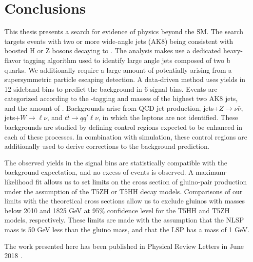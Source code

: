 \chapter{Conclusions}
\label{chap:conclusions}

This thesis presents a search for evidence of physics beyond the SM. The search targets events with two or more wide-angle jets (AK8) being consistent with boosted H or Z bosons decaying to \bbbar. The analysis makes use a dedicated heavy-flavor tagging algorithm used to identify large angle jets composed of two b quarks. We additionally require a large amount of \ptmiss potentially arising from a supersymmetric particle escaping detection. A data-driven method uses yields in 12 sideband bins to predict the background in 6 signal bins. Events are categorized according to the \bbbar-tagging and masses of the highest two \pt AK8 jets, and the amount of \ptmiss. Backgrounds arise from QCD jet production, jets+$Z\rightarrow\nu\bar{\nu}$, jets+$W\rightarrow\ell\nu$, and $t\bar{t}\rightarrow q q' \ell \nu$, in which the leptons are not identified. These backgrounds are studied by defining control regions expected to be enhanced in each of these processes. In combination with simulation, these control regions are additionally used to derive corrections to the background prediction. 

The observed yields in the signal bins are statistically compatible with the background expectation, and no excess of events is observed. A maximum-likelihood fit allows us to set limits on the cross section of gluino-pair production under the assumption of the T5ZH or T5HH decay models. Comparisons of our limits with the theoretical cross sections allow us to exclude gluinos with masses below 2010 and 1825 GeV at 95\% confidence level for the T5HH and T5ZH models, respectively. These limits are made with the assumption that the NLSP mass is 50 GeV less than the gluino mass, and that the LSP has a mass of 1 GeV.

The work presented here has been published in Physical Review Letters in June 2018 \cite{CMS-SUS-17-006}.